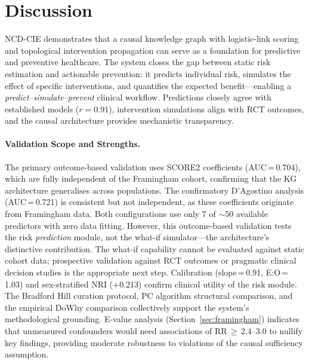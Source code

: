 \documentclass[runningheads]{llncs}
\begin{document}
\section{Discussion}\label{sec:discussion}

NCD-CIE demonstrates that a causal knowledge graph with logistic-link
scoring and topological intervention propagation can serve as a
foundation for predictive and preventive healthcare.
The system closes the gap between static risk estimation and
actionable prevention: it predicts individual risk, simulates
the effect of specific interventions, and quantifies the expected
benefit---enabling a \emph{predict--simulate--prevent} clinical workflow.
Predictions closely agree with established models ($r = 0.91$),
intervention simulations align with RCT outcomes, and the causal
architecture provides mechanistic transparency.

\paragraph{Validation Scope and Strengths.}
The primary outcome-based validation uses SCORE2 coefficients
(AUC\,=\,0.704), which are fully independent of the Framingham
cohort, confirming that the KG architecture generalises across
populations.
The confirmatory D'Agostino analysis (AUC\,=\,0.721) is consistent
but not independent, as these coefficients originate from
Framingham data.
Both configurations use only 7 of ${\sim}$50 available predictors
with zero data fitting.
However, this outcome-based validation tests the risk \emph{prediction}
module, not the what-if simulator---the architecture's distinctive
contribution.
The what-if capability cannot be evaluated against static cohort data;
prospective validation against RCT outcomes or pragmatic clinical
decision studies is the appropriate next step.
Calibration (slope\,=\,0.91, E:O\,=\,1.03) and sex-stratified
NRI ($+$0.213) confirm clinical utility of the risk module.
The Bradford Hill curation protocol, PC algorithm structural
comparison, and the empirical DoWhy comparison collectively
support the system's methodological grounding.
E-value analysis (Section~\ref{sec:framingham}) indicates that
unmeasured confounders would need associations of RR\,$\geq$\,2.4--3.0
to nullify key findings, providing moderate robustness to violations
of the causal sufficiency assumption.
\end{document}
